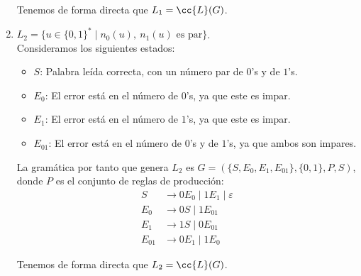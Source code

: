 \documentclass[12pt]{article}
\begin{document}
\begin{ejercicio}
\begin{enumerate}
            Tenemos de forma directa que $L_1=\cc{L}(G)$.

            \item $L_2 = \{u\in \{0,1\}^\ast \mid n_0(u),~n_1(u)\text{ es par}\}$.\\
            
            Consideramos los siguientes estados:
            \begin{itemize}
                \item $S$: Palabra leída correcta, con un número par de $0$'s y de $1$'s.
                \item $E_{0}$: El error está en el número de $0$'s, ya que este es impar.
                \item $E_{1}$: El error está en el número de $1$'s, ya que este es impar.
                \item $E_{01}$: El error está en el número de $0$'s y de $1$'s, ya que ambos son impares.
            \end{itemize}

            La gramática por tanto que genera $L_2$ es $G=(\{S,E_0,E_1,E_{01}\},\{0,1\},P,S)$, donde $P$ es el conjunto de reglas de producción:
            \begin{align*}
                S &\rightarrow 0E_0 \mid 1E_1 \mid \varepsilon\\
                E_0 &\rightarrow 0S \mid 1E_{01}\\
                E_1 &\rightarrow 1S \mid 0E_{01}\\
                E_{01} &\rightarrow 0E_1 \mid 1E_0
            \end{align*}

            Tenemos de forma directa que $L_2=\cc{L}(G)$.
        \end{enumerate}
    \end{ejercicio}
\end{document}
